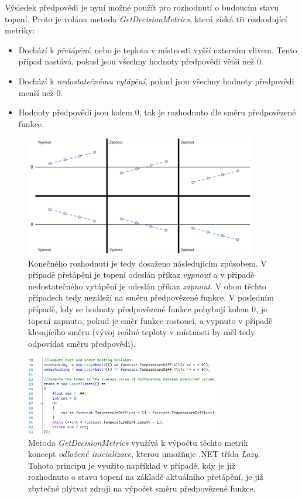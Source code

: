 Výsledek předpovědi je nyní možné použít pro rozhodnutí o budoucím stavu topení. Proto je volána metoda {\it GetDecisionMetrics}, která získá tři rozhodující metriky:
\begin{itemize}
    \item Dochází k {\it přetápění}, nebo je teplota v místnosti vyšší externím vlivem. Tento případ nastává, pokud jsou všechny hodnoty předpovědí větší než 0.
    \item Dochází k {\it nedostatečnému vytápění}, pokud jsou všechny hodnoty předpovědi menší než 0.
    \item Hodnoty předpovědi jsou kolem 0, tak je rozhodnuto dle směru předpovězené funkce.
\end{itemize}

\begin{figure}[H]
\centering
\includegraphics[width=0.9\textwidth]{obrazky-figures/mlalgorithm.png}
\caption{Konečného rozhodnutí je tedy dosaženo následujícím způsobem. V případě přetápění je topení odeslán příkaz {\it vypnout} a v případě nedostatečného vytápění je odeslán příkaz {\it zapnout}. V obou těchto případech tedy nezáleží na směru předpovězené funkce. V posledním případě, kdy se hodnoty předpovězené funkce pohybují kolem 0, je topení zapnuto, pokud je směr funkce rostoucí, a vypnuto v případě klesajícího směru (vývoj reálné teploty v místnosti by měl tedy odpovídat směru předpovědi).}
\end{figure}

\begin{figure}[H]
\includegraphics[width=0.76\textwidth]{obrazky-figures/code-get-ml-metrics.png}
\caption{Metoda {\it GetDecisionMetrics} využívá k výpočtu těchto metrik koncept {\it odložené inicializace}, kterou umožňuje .NET třída {\it Lazy}. Tohoto principu je využito například v případě, kdy je již rozhodnuto o stavu topení na základě aktuálního přetápění, je již zbytečné plýtvat zdroji na výpočet směru předpovězené funkce.}
\end{figure}

